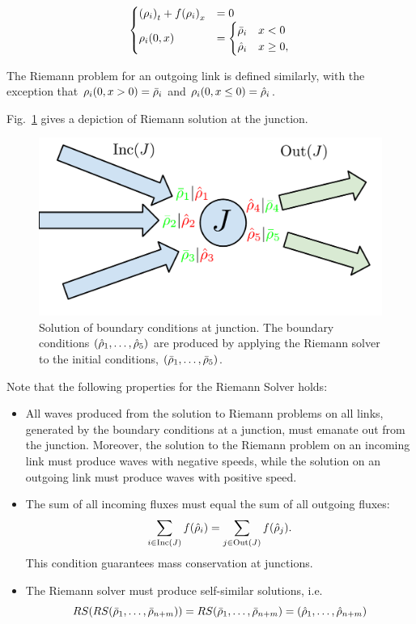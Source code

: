 \begin{equation}
\begin{cases}
\left(\rho_{\link}\right)_{t}+f\left(\rho_{\link}\right)_{x} & =0\\
\rho_{\link}\left(0,x\right) & =\begin{cases}
\initstate_{\link} & x<0\\
\trace{\rho}_{\link} & x\ge0,
\end{cases}
\end{cases}\label{eq:riemann-problem}
\end{equation}

The Riemann problem for an outgoing link is defined similarly, with
the exception that $\rho_{\link}\left(0,x>0\right)=\initstate_{\link}$
and $\rho_{\link}\left(0,x\le0\right)=\trace{\rho}_{\link}$. 

Fig.~\ref{fig:Solution-of-boundary}
gives a depiction of Riemann solution at the junction.%

\begin{figure}
\centering
\includegraphics[width=0.5\columnwidth]{previous-articles/adjoint/presentation/figs-gen/junctions-riemann-rs} 
\caption{Solution of boundary conditions at junction. The boundary conditions
$\tuple{\trace{\rho}_{1}}{\trace{\rho}_{5}}$ are produced by applying
the Riemann solver to the initial conditions, $\tuple{\initstate_{1}}{\initstate_{5}}$.}
\label{fig:Solution-of-boundary}
\end{figure}


Note that the following properties for the Riemann Solver holds:
\begin{itemize}
\item All waves produced from the solution to Riemann problems on all links,
generated by the boundary conditions at a junction, must emanate out
from the junction. Moreover, the solution to the Riemann problem
on an incoming link must produce waves with negative speeds, while
the solution on an outgoing link must produce waves with positive
speed. 
\item The sum of all incoming fluxes must equal the sum of all outgoing
fluxes: 
\[
\sum_{i\in\Inc\left(\jn\right)}f\left(\trace{\rho}_{\link}\right)=\sum_{j\in\Out\left(\jn\right)}f\left(\trace{\rho}_{j}\right).
\]
This condition guarantees mass conservation at junctions.
\item The Riemann solver must produce self-similar solutions, i.e. 
\[
\RS\left(\RS\tuple{\initstate_{1}}{\initstate_{\ninc+\nout}}\right)=\RS\tuple{\initstate_{1}}{\initstate_{\ninc+\nout}}=\tuple{\trace{\rho}_{1}}{\trace{\rho}_{\ninc+\nout}}
\]
\end{itemize}

